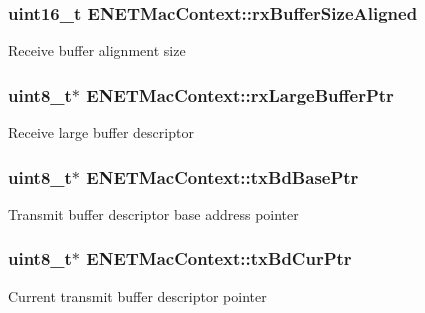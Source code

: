 \subsubsection[{\texorpdfstring{rx\+Buffer\+Size\+Aligned}{rxBufferSizeAligned}}]{\setlength{\rightskip}{0pt plus 5cm}uint16\+\_\+t E\+N\+E\+T\+Mac\+Context\+::rx\+Buffer\+Size\+Aligned}\hypertarget{structENETMacContext_a4245b98c8ec044c3d2b46e6be14cc67f}{}\label{structENETMacContext_a4245b98c8ec044c3d2b46e6be14cc67f}
Receive buffer alignment size 
\subsubsection[{\texorpdfstring{rx\+Large\+Buffer\+Ptr}{rxLargeBufferPtr}}]{\setlength{\rightskip}{0pt plus 5cm}uint8\+\_\+t$\ast$ E\+N\+E\+T\+Mac\+Context\+::rx\+Large\+Buffer\+Ptr}\hypertarget{structENETMacContext_adc4c623fb65846cfe36082133144dd1f}{}\label{structENETMacContext_adc4c623fb65846cfe36082133144dd1f}
Receive large buffer descriptor 
\subsubsection[{\texorpdfstring{tx\+Bd\+Base\+Ptr}{txBdBasePtr}}]{\setlength{\rightskip}{0pt plus 5cm}uint8\+\_\+t$\ast$ E\+N\+E\+T\+Mac\+Context\+::tx\+Bd\+Base\+Ptr}\hypertarget{structENETMacContext_a64745c164bca90c5a763c976669f380e}{}\label{structENETMacContext_a64745c164bca90c5a763c976669f380e}
Transmit buffer descriptor base address pointer 
\subsubsection[{\texorpdfstring{tx\+Bd\+Cur\+Ptr}{txBdCurPtr}}]{\setlength{\rightskip}{0pt plus 5cm}uint8\+\_\+t$\ast$ E\+N\+E\+T\+Mac\+Context\+::tx\+Bd\+Cur\+Ptr}\hypertarget{structENETMacContext_a13579478c98974868f1dd1d0b2a31455}{}\label{structENETMacContext_a13579478c98974868f1dd1d0b2a31455}
Current transmit buffer descriptor pointer 
